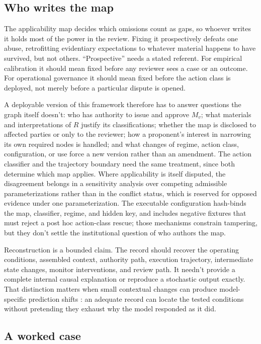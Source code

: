 \subsection{Who writes the map}

The applicability map decides which omissions count as gaps, so whoever writes it holds most of the power in the review. Fixing it prospectively defeats one abuse, retrofitting evidentiary expectations to whatever material happens to have survived, but not others. \enquote{Prospective} needs a stated referent. For empirical calibration it should mean fixed before any reviewer sees a case or an outcome. For operational governance it should mean fixed before the action class is deployed, not merely before a particular dispute is opened.

A deployable version of this framework therefore has to answer questions the graph itself doesn't: who has authority to issue and approve \(M_v\); what materials and interpretations of \(R\) justify its classifications; whether the map is disclosed to affected parties or only to the reviewer; how a proponent's interest in narrowing its own required nodes is handled; and what changes of regime, action class, configuration, or use force a new version rather than an amendment. The action classifier and the trajectory boundary need the same treatment, since both determine which map applies. Where applicability is itself disputed, the disagreement belongs in a sensitivity analysis over competing admissible parameterizations rather than in the conflict status, which is reserved for opposed evidence under one parameterization. The executable configuration hash-binds the map, classifier, regime, and hidden key, and includes negative fixtures that must reject a post hoc action-class rescue; those mechanisms constrain tampering, but they don't settle the institutional question of who authors the map.

Reconstruction is a bounded claim. The record should recover the operating conditions, assembled context, authority path, execution trajectory, intermediate state changes, monitor interventions, and review path. It needn't provide a complete internal causal explanation or reproduce a stochastic output exactly. That distinction matters when small contextual changes can produce model-specific prediction shifts \citep{zhang2026illusionRobustness}: an adequate record can locate the tested conditions without pretending they exhaust why the model responded as it did.

\subsection{A worked case}
\label{sec:worked-case}

